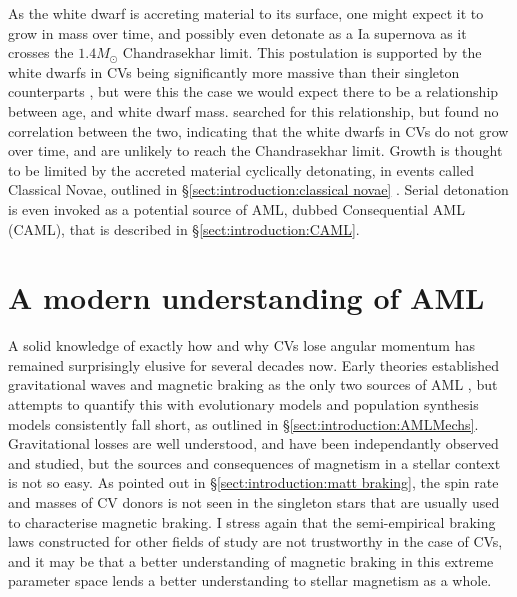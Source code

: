 As the white dwarf is accreting material to its surface, one might expect it to grow in mass over time, and possibly even detonate as a Ia supernova as it crosses the $1.4 M_\odot$ Chandrasekhar limit. This postulation is supported by the white dwarfs in CVs being significantly more massive than their singleton counterparts , but were this the case we would expect there to be a relationship between age, and white dwarf mass. \citet{McAllister2019} searched for this relationship, but found no correlation between the two, indicating that the white dwarfs in CVs do not grow over time, and are unlikely to reach the Chandrasekhar limit. Growth is thought to be limited by the accreted material cyclically detonating, in events called Classical Novae, outlined in \S\ref{sect:introduction:classical novae} \citep{Wijnen2015,sparks2021}. Serial detonation is even invoked as a potential source of AML, dubbed Consequential AML (CAML), that is described in \S\ref{sect:introduction:CAML}.


\section{A modern understanding of AML}
A solid knowledge of exactly how and why CVs lose angular momentum has remained surprisingly elusive for several decades now. Early theories established gravitational waves and magnetic braking as the only two sources of AML , but attempts to quantify this with evolutionary models  and population synthesis models  consistently fall short, as outlined in \S\ref{sect:introduction:AMLMechs}. Gravitational losses are well understood, and have been independantly observed and studied, but the sources and consequences of magnetism in a stellar context is not so easy. 
As pointed out in \S\ref{sect:introduction:matt braking}, the spin rate and masses of CV donors is not seen in the singleton stars that are usually used to characterise magnetic braking. I stress again that the semi-empirical braking laws constructed for other fields of study are not trustworthy in the case of CVs, and it may be that a better understanding of magnetic braking in this extreme parameter space lends a better understanding to stellar magnetism as a whole. 

